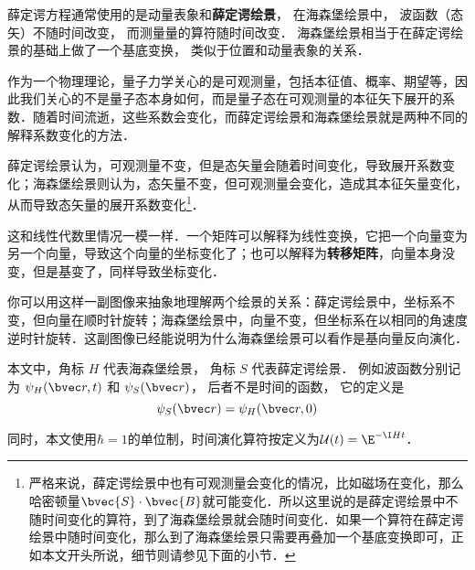 



薛定谔方程通常使用的是动量表象和\textbf{薛定谔绘景}， 在海森堡绘景中， 波函数（态矢）不随时间改变， 而测量量的算符随时间改变． 海森堡绘景相当于在薛定谔绘景的基础上做了一个基底变换， 类似于位置和动量表象的关系．



作为一个物理理论，量子力学关心的是可观测量，包括本征值、概率、期望等，因此我们关心的不是量子态本身如何，而是量子态在可观测量的本征矢下展开的系数．随着时间流逝，这些系数会变化，而薛定谔绘景和海森堡绘景就是两种不同的解释系数变化的方法．

薛定谔绘景认为，可观测量不变，但是态矢量会随着时间变化，导致展开系数变化；海森堡绘景则认为，态矢量不变，但可观测量会变化，造成其本征矢量变化，从而导致态矢量的展开系数变化\footnote{严格来说，薛定谔绘景中也有可观测量会变化的情况，比如磁场在变化，那么哈密顿量$\bvec{S}\cdot \bvec{B}$就可能变化．所以这里说的是薛定谔绘景中不随时间变化的算符，到了海森堡绘景就会随时间变化．如果一个算符在薛定谔绘景中随时间变化，那么到了海森堡绘景只需要再叠加一个基底变换即可，正如本文开头所说，细节则请参见下面的小节．}．

这和线性代数里情况一模一样．一个矩阵可以解释为线性变换，它把一个向量变为另一个向量，导致这个向量的坐标变化了；也可以解释为\textbf{转移矩阵}，向量本身没变，但是基变了，同样导致坐标变化．

你可以用这样一副图像来抽象地理解两个绘景的关系：薛定谔绘景中，坐标系不变，但向量在顺时针旋转；海森堡绘景中，向量不变，但坐标系在以相同的角速度逆时针旋转．这副图像已经能说明为什么海森堡绘景可以看作是基向量反向演化．



本文中，角标 $H$ 代表海森堡绘景， 角标 $S$ 代表薛定谔绘景． 例如波函数分别记为 $\psi_H(\bvec r, t)$ 和 $\psi_S(\bvec r)$， 后者不是时间的函数， 它的定义是
\begin{equation}
\psi_S(\bvec r) = \psi_H(\bvec r, 0)
\end{equation}

同时，本文使用$\hbar=1$的单位制，时间演化算符按定义为$\mathcal{U}(t)=\E^{-\I H t}$．


